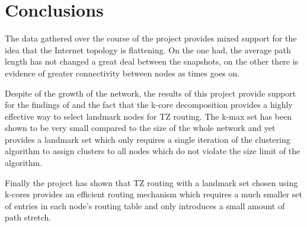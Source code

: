 \documentclass{dissertation/mpaper}
\begin{document}
\section{Conclusions}
The data gathered over the course of the project provides mixed support for the idea that the Internet topology is flattening. On the one had, the average path length has not changed a great deal between the snapshots, on the other there is evidence of greater connectivity between nodes as times goes on. 

Despite of the growth of the network, the results of this project provide support for the findings of \cite{strowes} and the fact that the k-core decomposition provides a highly effective way to select landmark nodes for TZ routing. The k-max set has been shown to be very small compared to the size of the whole network and yet provides a landmark set which only requires a single iteration of the clustering algorithm to assign clusters to all nodes which do not violate the size limit of the algorithm. 

Finally the project has shown that TZ routing with a landmark set chosen using k-cores provides an efficient routing mechanism which requires a much smaller set of entries in each node's routing table and only introduces a small amount of path stretch. \newline

\newpage


\end{document}
